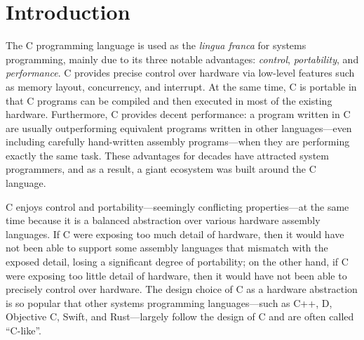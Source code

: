 \section{Introduction}
\label{sec:introduction}

The C programming language is used as the \emph{lingua franca} for systems programming, mainly due
to its three notable advantages: \emph{control}, \emph{portability}, and \emph{performance}.  C
provides precise control over hardware via low-level features such as memory layout, concurrency,
and interrupt.  At the same time, C is portable in that C programs can be compiled and then executed
in most of the existing hardware.  Furthermore, C provides decent performance: a program written in
C are usually outperforming equivalent programs written in other languages---even including
carefully hand-written assembly programs---when they are performing exactly the same task.  These
advantages for decades have attracted system programmers, and as a result, a giant ecosystem was
built around the C language.

C enjoys control and portability---seemingly conflicting properties---at the same time because it is
a balanced abstraction over various hardware assembly languages.  If C were exposing too much detail
of hardware, then it would have not been able to support some assembly languages that mismatch with
the exposed detail, losing a significant degree of portability; on the other hand, if C were
exposing too little detail of hardware, then it would have not been able to precisely control over
hardware.  The design choice of C as a hardware abstraction is so popular that other systems
programming languages---such as C++, D, Objective C, Swift, and Rust---largely follow the design of
C and are often called ``C-like''.





